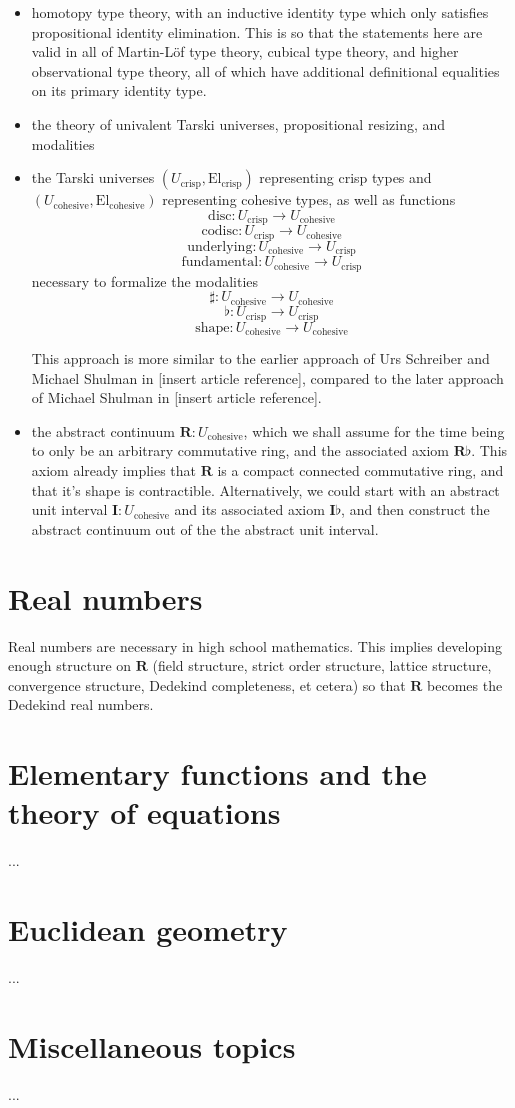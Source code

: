 \documentclass[one]{article}
\begin{document}
\begin{itemize}
\item homotopy type theory, with an inductive identity type which only satisfies propositional identity elimination. This is so that the statements here are valid in all of Martin-Löf type theory, cubical type theory, and higher observational type theory, all of which have additional definitional equalities on its primary identity type. 

\item the theory of univalent Tarski universes, propositional resizing, and modalities

\item the Tarski universes $(U_\mathrm{crisp}, \mathrm{El}_\mathrm{crisp})$ representing crisp types and $(U_\mathrm{cohesive}, \mathrm{El}_\mathrm{cohesive})$ representing cohesive types, as well as functions 
$$\mathrm{disc}:U_\mathrm{crisp} \to U_\mathrm{cohesive}$$ 
$$\mathrm{codisc}:U_\mathrm{crisp} \to U_\mathrm{cohesive}$$
$$\mathrm{underlying}:U_\mathrm{cohesive} \to U_\mathrm{crisp}$$ 
$$\mathrm{fundamental}:U_\mathrm{cohesive} \to U_\mathrm{crisp}$$ 
necessary to formalize the modalities 
$$\sharp:U_\mathrm{cohesive} \to U_\mathrm{cohesive}$$
$$\flat:U_\mathrm{crisp} \to U_\mathrm{crisp}$$
$$\mathrm{shape}:U_\mathrm{cohesive} \to U_\mathrm{cohesive}$$

This approach is more similar to the earlier approach of Urs Schreiber and Michael Shulman in [insert article reference], compared to the later approach of Michael Shulman in [insert article reference]. 

\item the abstract continuum $\mathbf{R}:U_\mathrm{cohesive}$, which we shall assume for the time being to only be an arbitrary commutative ring, and the associated axiom $\mathbf{R} \flat$. This axiom already implies that $\mathbf{R}$ is a compact connected commutative ring, and that it's shape is contractible. Alternatively, we could start with an abstract unit interval $\mathbf{I}:U_\mathrm{cohesive}$ and its associated axiom $\mathbf{I} \flat$, and then construct the abstract continuum out of the the abstract unit interval. 
\end{itemize}

\section{Real numbers}

Real numbers are necessary in high school mathematics. This implies developing enough structure on $\mathbf{R}$ (field structure, strict order structure, lattice structure, convergence structure, Dedekind completeness, et cetera) so that $\mathbf{R}$ becomes the Dedekind real numbers. 

\section{Elementary functions and the theory of equations}

...

\section{Euclidean geometry}

...

\section{Miscellaneous topics}

...
\end{document}
